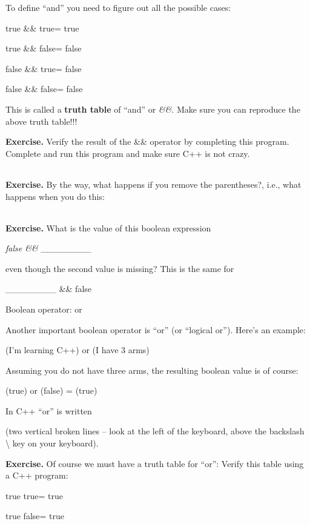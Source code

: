 \documentclass[
]{article}
\begin{document}
To define ``and'' you need to figure out all the possible cases:

true \&\& true= true

true \&\& false= false

false \&\& true= false

false \&\& false= false

This is called a \textbf{truth table} of ``and'' or \emph{\&\&}. Make
sure you can reproduce the above truth table!!!

\textbf{Exercise.} Verify the result of the \&\& operator by completing
this program. Complete and run this program and make sure C++ is not
crazy.

\begin{longtable}[]{@{}@{}}
\toprule
\endhead
\bottomrule
\end{longtable}

\textbf{Exercise.} By the way, what happens if you remove the
parentheses?, i.e., what happens when you do this:

\begin{longtable}[]{@{}@{}}
\toprule
\endhead
\bottomrule
\end{longtable}

\textbf{Exercise. }What is the value of this boolean expression

\emph{false \&\& \_\_\_\_\_\_\_\_}

even though the second value is missing? This is the same for

\_\_\_\_\_\_\_\_ \&\& false

Boolean operator: or

Another important boolean operator is ``or'' (or ``logical or''). Here's
an example:

(I'm learning C++) or (I have 3 arms)

Assuming you do not have three arms, the resulting boolean value is of
course:

(true) or (false) = (true)

In C++ ``or'' is written

\emph{\textbf{\textbar\textbar{}}}

(two vertical broken lines -- look at the left of the keyboard, above
the backslash \textbackslash{} key on your keyboard).

\textbf{Exercise.} Of course we must have a truth table for ``or'':
Verify this table using a C++ program:

true \emph{\textbar\textbar{}} true= true

true \emph{\textbar\textbar{}} false= true
\end{document}
